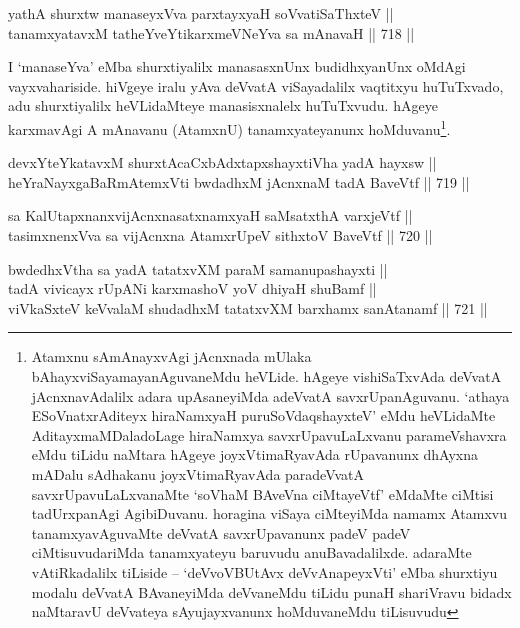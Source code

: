 \begin{shl}
yathA shurxtw manaseyxVva parxtayxyaH soV\s vatiSaThxteV ||  \\
tanamxyatavxM tatheYveYtikarxmeVNeYva sa mAnavaH \hfill || 718 ||  
\end{shl}

\begin{artha} 
I `manaseYva' eMba shurxtiyalilx manasasxnUnx budidhxyanUnx oMdAgi vayxvahariside. hiVgeye iralu yAva deVvatA viSayadalilx vaqtitxyu huTuTxvado, adu shurxtiyalilx heVLidaMteye manasisxnalelx huTuTxvudu. hAgeye karxmavAgi A mAnavanu (AtamxnU) tanamxyateyanunx hoMduvanu\footnote{Atamxnu sAmAnayxvAgi jAcnxnada mUlaka bAhayxviSayamayanAguvaneMdu heVLide. hAgeye vishiSaTxvAda deVvatA jAcnxnavAdalilx adara upAsaneyiMda adeVvatA savxrUpanAguvanu. `athaya ESoV\s natxrAditeyx hiraNamxyaH puruSoVdaqshayxteV' eMdu heVLidaMte AditayxmaMDaladoLage hiraNamxya savxrUpavuLaLxvanu parameVshavxra eMdu tiLidu naMtara hAgeye joyxVtimaRyavAda rUpavanunx dhAyxna mADalu sAdhakanu joyxVtimaRyavAda paradeVvatA savxrUpavuLaLxvanaMte `soVhaM BAveVna ciMtayeVtf' eMdaMte ciMtisi tadUrxpanAgi AgibiDuvanu. horagina viSaya ciMteyiMda namamx Atamxvu tanamxyavAguvaMte deVvatA savxrUpavanunx padeV padeV ciMtisuvudariMda tanamxyateyu baruvudu anuBavadalilxde. adaraMte vAtiRkadalilx tiLiside {\rm --} `deVvoVBUtAvx deVvAnapeyxVti' eMba shurxtiyu modalu deVvatA BAvaneyiMda deVvaneMdu tiLidu punaH shariVravu bidadx naMtaravU deVvateya sAyujayxvanunx hoMduvaneMdu tiLisuvudu}.
\end{artha}


\begin{shl}
devxYteYkatavxM shurxtAcaCxbAdxtapxshayxtiVha yadA hayxsw || \\
heYraNayxgaBaRmAtemxVti bwdadhxM jAcnxnaM tadA BaveVtf \hfill || 719 ||  
\end{shl}
				
\begin{shl}
sa KalUtapxnanxvijAcnxnasatxnamxyaH saMsatxthA varxjeVtf || \\
tasimxnenxVva sa vijAcnxna AtamxrUpeV sithxtoV BaveVtf \hfill || 720 ||  
\end{shl}
				
\begin{shl}
bwdedhxV\s tha sa yadA tatatxvXM paraM samanupashayxti || \\
tadA vivicayx rUpANi karxmashoV yoV dhiyaH shuBamf || \\
viVkaSxteV keVvalaM shudadhxM tatatxvXM barxhamx sanAtanamf \hfill || 721 ||  
\end{shl}

